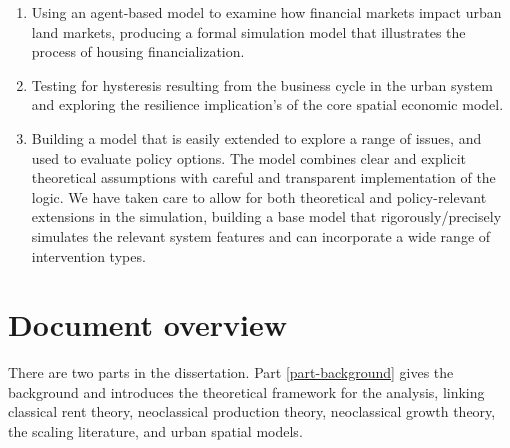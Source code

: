 \begin{enumerate}
    \item Using an agent-based model to examine how financial markets impact urban \glspl{land market},
producing a formal simulation model that illustrates the process of housing financialization. 

    \item Testing for \gls{hysteresis} resulting from the business cycle in the urban system and exploring the \gls{resilience} implication's of the core spatial economic model.

    \item Building a model that is easily extended to explore a range of issues, and used to evaluate policy options. 
The model combines clear and explicit theoretical assumptions with careful and transparent implementation of the logic. %
We have taken care to allow for  both theoretical and policy-relevant extensions in the simulation,  building a base model that 
rigorously/precisely simulates the relevant system features and can incorporate a wide range of intervention types. %
\end{enumerate}

\section{Document overview}

There are two parts in the dissertation. 
Part \ref{part-background} gives the background and introduces the theoretical framework for the analysis,  linking classical rent theory, neoclassical production theory, neoclassical growth theory, the scaling literature, and urban spatial models. 


